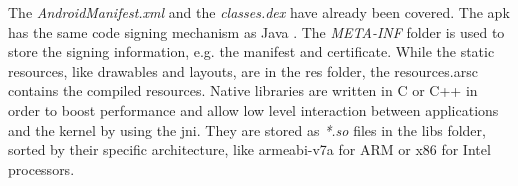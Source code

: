 \newline
The \textit{AndroidManifest.xml} and the \textit{classes.dex} have already been covered.
\newline
The \gls{apk} has the same code signing mechanism as Java .
The \textit{META-INF} folder is used to store the signing information, e.g. the manifest and certificate. \cite{codeSigning} \cite{metaJava}
\newline
While the static resources, like drawables and layouts, are in the res folder, the resources.arsc contains the compiled resources.
\newline
Native libraries are written in C or C++ in order to boost performance and allow low level interaction between applications and the kernel by using the \gls{jni}.
They are stored as \textit{*.so} files in the libs folder, sorted by their specific architecture, like armeabi-v7a for ARM or x86 for Intel processors.
\cite{kovachevaMaster} \cite{ehringerDalvik}
